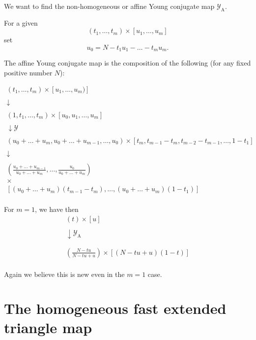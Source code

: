 \documentclass[12pt,oneside,openany]{article}
\begin{document}
We want to find the non-homogeneous  or affine Young conjugate map $\mathcal{Y}_{\mbox{A}}$.

For a given 
$$(t_1, \ldots, t_m) \times [u_1, \ldots, u_m]$$
set
$$u_0 = N - t_1 u_1 - \ldots - t_m u_m.$$

The affine Young conjugate map is the composition of the following (for any fixed positive number $N$):


$$\begin{array}{c}
(t_1, \ldots, t_m) \times  [u_1, \ldots, u_m)] \\ \\
\downarrow \\ \\
\left(  1  ,    t_1  ,   \ldots,    t_m      \right)  \times [u_0, u_1, \ldots, u_m]  \\ \\
\downarrow \mathcal{Y} \\ \\
(u_0 + \ldots + u_m, u_0 + \ldots + u_{m-1}, \ldots, u_0) \times [t_m, t_{m-1}-t_m, t_{m-2} - t_{m-1} , \ldots, 1 - t_1] \\ \\
\downarrow \\ \\
\left(   \frac{  u_0 + \ldots + u_{m-1}}{ u_0 + \ldots + u_{m}}, \ldots,  \frac{  u_0 }{ u_0 + \ldots + u_{m}} \right) \\
\times \\
 \left[ (u_0 + \ldots + u_{m})(t_{m-1}- t_m) , \ldots , (u_0 + \ldots + u_{m})(1- t_1)\right] \\
  \end{array}$$

For $m=1$, we have then 
$$\begin{array}{c}
(t) \times  [u] \\ \\
\downarrow  \mathcal{Y}_{\mbox{A}}   \\ \\
\\
\left(   \frac{  N-t u}{ N-tu + u}\right)   \times 
 \left[ (N-tu + u) (1- t)\right] \\
  \end{array}$$

Again we believe this is new even in the  $m=1$ case.










\section{The homogeneous fast extended triangle map }\label{fast homogeneous case}
\end{document}

